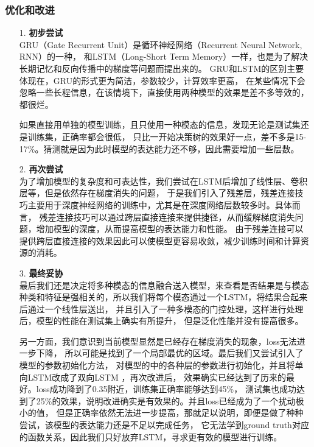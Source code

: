 \documentclass[11pt]{article}
\begin{document}
            \subsubsection{优化和改进}
            \begin{enumerate}
                \item [1. ]\textbf{初步尝试}\\
                GRU（Gate Recurrent Unit）是循环神经网络（Recurrent Neural Network, RNN）的一种，
                和LSTM（Long-Short Term Memory）一样，也是为了解决长期记忆和反向传播中的梯度等问题而提出来的。
                GRU和LSTM的区别主要体现在，GRU的形式更为简洁，参数较少，计算效率更高，
                在某些情况下会忽略一些长程信息，在该情境下，直接使用两种模型的效果是差不多等效的，都很烂。
                
                如果直接用单独的模型训练，且只使用一种模态的信息，发现无论是测试集还是训练集，正确率都会很低，
                只比一开始决策树的效果好一点，差不多是15-17\%。猜测就是因为此时模型的表达能力还不够，因此需要增加一些层数。
                
                \item [2. ]\textbf{再次尝试}\\
                为了增加模型的复杂度和可表达性，我们尝试在LSTM后增加了线性层、卷积层等，但是依然存在梯度消失的问题，
                于是我们引入了残差层，残差连接技巧主要用于深度神经网络的训练中，尤其是在深度网络层数较多时。具体而言，
                残差连接技巧可以通过跨层直接连接来提供捷径，从而缓解梯度消失问题，增加模型的深度，从而提高模型的表达能力和性能。
                由于残差连接可以提供跨层直接连接的效果因此可以使模型更容易收敛，减少训练时间和计算资源的消耗。

                \item [3. ]\textbf{最终妥协}\\
                最后我们还是决定将多种模态的信息融合送入模型，来查看是否结果是与模态
                种类和特征是强相关的，所以我们将每个模态通过一个LSTM，将结果合起来后通过一个线性层送出，
                并且引入了一种多模态的门控处理，这样进行处理后，模型的性能在测试集上确实有所提升，
                但是泛化性能并没有提高很多。
                
                另一方面，我们意识到当前模型显然是已经存在梯度消失的现象，loss无法进一步下降，
                所以可能是找到了一个局部最优的区域。最后我们又尝试引入了模型的参数初始化方法，
                对模型的中的各种层的参数进行初始化，并且将单向LSTM改成了双向LSTM ，再次改进后，
                效果确实已经达到了历来的最好。loss成功降到了0.35附近，训练集正确率能够达到45\%，
                测试集也成功达到了25\%的效果，说明改进确实是有效果的。并且loss已经成为了一个扰动极小的值，
                但是正确率依然无法进一步提高，那就足以说明，即便是做了种种尝试，该模型的表达能力还是不足以完成任务，
                它无法学到ground truth对应的函数关系，因此我们只好放弃LSTM，寻求更有效的模型进行训练。

            \end{enumerate}
\end{document}
